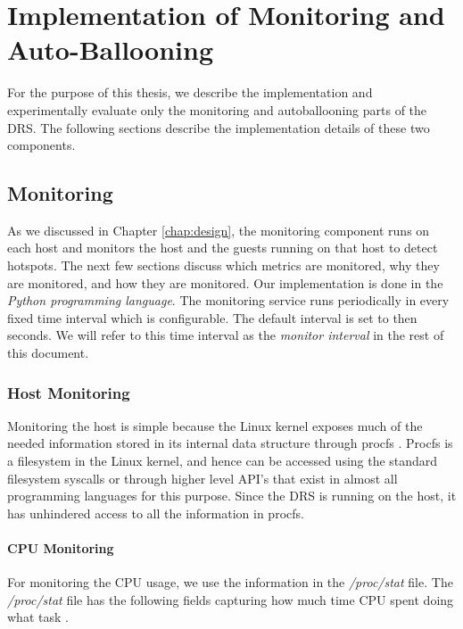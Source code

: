 \chapter{Implementation of Monitoring and Auto-Ballooning}
\label{chap:impl}

For the purpose of this thesis, we describe the implementation and experimentally evaluate only the monitoring and autoballooning parts of the DRS. The following sections describe the implementation details of these two components.

\section{Monitoring}
As we discussed in Chapter \ref{chap:design}, the monitoring component runs on each host and monitors the host and the guests running on that host to detect hotspots. The next few sections discuss which metrics are monitored, why they are monitored, and how they are monitored. Our implementation is done in the \textit{Python programming language}. The monitoring service runs periodically in every fixed time interval which is configurable. The default interval is set to then seconds. We will refer to this time interval as the \textit{monitor interval} in the rest of this document.

\subsection{Host Monitoring}
Monitoring the host is simple because the Linux kernel exposes much of the needed information stored in its internal data structure through procfs \cite{procfs}. Procfs is a filesystem in the Linux kernel, and hence can be accessed using the standard filesystem syscalls or through higher level API's that exist in almost all programming languages for this purpose. Since the DRS is running on the host, it has unhindered access to all the information in procfs.

\subsubsection{CPU Monitoring} \label{sec:cpumon}
For monitoring the CPU usage, we use the information in the  \textit{/proc/stat} file. The \textit{/proc/stat} file has the following fields capturing how much time CPU spent doing what task \cite{procfs}.

